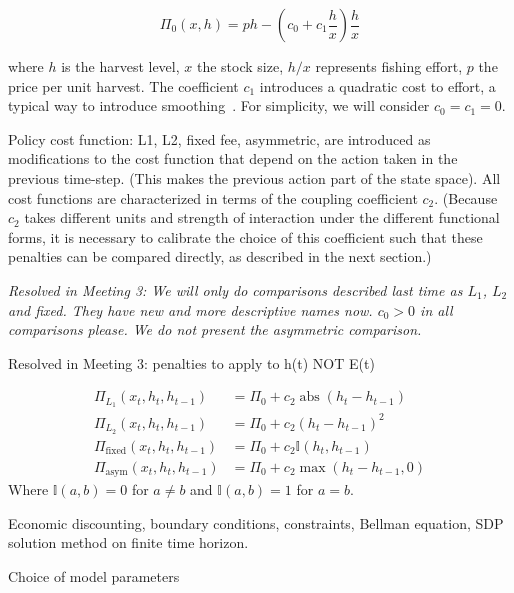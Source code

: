 \documentclass[authoryear, review, 12pt]{elsarticle}
\newcommand{\pa}[1]{{\it \color{darkblue} #1}}
\begin{document}
\begin{equation} 
\Pi_0(x,h) = p h - \left( c_0  + c_1 \frac{h}{x} \right) \frac{h}{x} \label{profit}
\end{equation}


where $h$ is the harvest level, $x$ the stock size, $h/x$ represents
fishing effort, $p$ the price per unit harvest.  The coefficient $c_1$
introduces a quadratic cost to effort, a typical way to introduce
smoothing~\citep[\emph{e.g.}][]{Singh2006}.  For simplicity, we will consider $c_0 = c_1 = 0$.

Policy cost function: L1, L2, fixed fee, asymmetric, are introduced
as modifications to the cost function that depend on the action
taken in the previous time-step.  (This makes the previous action part
of the state space).   All cost functions are characterized in terms
of the coupling coefficient $c_2$.  (Because $c_2$ takes different units
and strength of interaction under the different functional forms, it is
necessary to calibrate the choice of this coefficient such that these
penalties can be compared directly, as described in the next section.)

\pa{
Resolved in Meeting 3: We will only do comparisons described last time as $L_1$, $L_2$ and fixed. They have new and more descriptive names now. $c_0>0$ in all comparisons please. We do not present the asymmetric comparison.
 
Resolved in Meeting 3: penalties to apply to h(t) NOT E(t)
}

  \begin{align} 
    \Pi_{L_1}(x_t,h_t, h_{t-1}) &= \Pi_0 + c_2 \operatorname{abs}\left( h_t - h_{t-1} \right) \label{L1} \\
    \Pi_{L_2}(x_t,h_t, h_{t-1}) &= \Pi_0 + c_2 \left( h_t - h_{t-1} \right)^2 \label{L2} \\
    \Pi_{\textrm{fixed}}(x_t,h_t, h_{t-1}) &= \Pi_0 + c_2 \mathbb{I}(h_t, h_{t-1})  \label{fixed_fee} \\
    \Pi_{\textrm{asym}}(x_t,h_t, h_{t-1}) &= \Pi_0 + c_2 \operatorname{max}\left( h_t - h_{t-1}, 0 \right) \label{asym}
  \end{align}
  Where $\mathbb{I}(a,b) = 0$ for $a \neq b$ and  $\mathbb{I}(a,b) = 1$ for $a = b$.  

 Economic discounting, boundary conditions, constraints, Bellman equation, SDP solution method on finite time horizon.  

  
Choice of model parameters 
\end{document}
